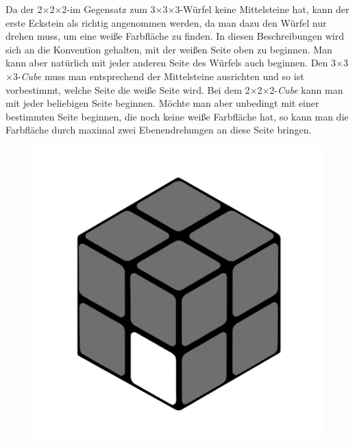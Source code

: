 \documentclass[12pt,a4paper, usenames, dvipsnames]{article}
\newcommand{\Ttwo}{2$\times$2$\times$2-}
\newcommand{\Tthree}{3$\times$3$\times$3-}
\begin{document}
Da der \Ttwo im Gegensatz zum \Tthree Würfel keine Mittelsteine hat, kann der erste Eckstein als richtig angenommen werden, da man dazu den Würfel nur drehen muss, um eine weiße Farbfläche zu finden.
In diesen Beschreibungen wird sich an die Konvention gehalten, mit der weißen Seite oben zu beginnen. Man kann aber natürlich mit jeder anderen Seite des Würfels auch beginnen.
Den \Tthree \textit{Cube} muss man entsprechend der Mittelsteine ausrichten und so ist vorbestimmt, welche Seite die weiße Seite wird. Bei dem \Ttwo \textit{Cube} kann man mit jeder beliebigen Seite beginnen. Möchte man aber unbedingt mit einer bestimmten Seite beginnen, die noch keine weiße Farbfläche hat, so kann man die Farbfläche durch maximal zwei Ebenendrehungen an diese Seite bringen.

\begin{figure}[h]
\centering
\includegraphics[scale=0.1]{e1_s1_s1.png}

\end{figure}
\end{document}
